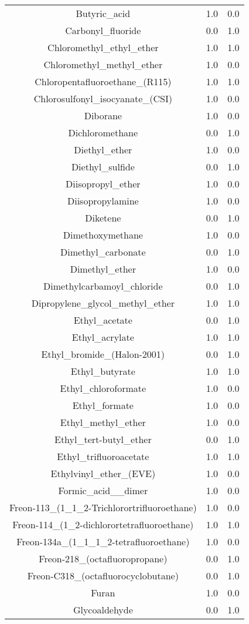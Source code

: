 \begin{tabular}{ccc}
Butyric_acid &1.0 &0.0\\
Carbonyl_fluoride &0.0 &1.0\\
Chloromethyl_ethyl_ether &1.0 &1.0\\
Chloromethyl_methyl_ether &1.0 &0.0\\
Chloropentafluoroethane_(R115) &1.0 &1.0\\
Chlorosulfonyl_isocyanate_(CSI) &1.0 &0.0\\
Diborane &1.0 &0.0\\
Dichloromethane &0.0 &1.0\\
Diethyl_ether &1.0 &0.0\\
Diethyl_sulfide &0.0 &1.0\\
Diisopropyl_ether &1.0 &0.0\\
Diisopropylamine &1.0 &0.0\\
Diketene &0.0 &1.0\\
Dimethoxymethane &1.0 &0.0\\
Dimethyl_carbonate &0.0 &1.0\\
Dimethyl_ether &1.0 &0.0\\
Dimethylcarbamoyl_chloride &0.0 &1.0\\
Dipropylene_glycol_methyl_ether &1.0 &1.0\\
Ethyl_acetate &0.0 &1.0\\
Ethyl_acrylate &1.0 &1.0\\
Ethyl_bromide_(Halon-2001) &0.0 &1.0\\
Ethyl_butyrate &1.0 &1.0\\
Ethyl_chloroformate &1.0 &0.0\\
Ethyl_formate &1.0 &0.0\\
Ethyl_methyl_ether &1.0 &0.0\\
Ethyl_tert-butyl_ether &0.0 &1.0\\
Ethyl_trifluoroacetate &1.0 &1.0\\
Ethylvinyl_ether_(EVE) &1.0 &0.0\\
Formic_acid__dimer &1.0 &0.0\\
Freon-113_(1_1_2-Trichlorortrifluoroethane) &1.0 &0.0\\
Freon-114_(1_2-dichlorortetrafluoroethane) &1.0 &1.0\\
Freon-134a_(1_1_1_2-tetrafluoroethane) &1.0 &0.0\\
Freon-218_(octafluoropropane) &0.0 &1.0\\
Freon-C318_(octafluorocyclobutane) &0.0 &1.0\\
Furan &1.0 &0.0\\
Glycoaldehyde &0.0 &1.0\\

\end{tabular}

